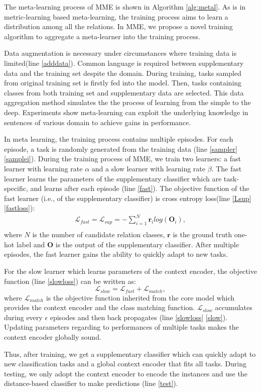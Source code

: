 The meta-learning process of MME is shown in Algorithm \ref{alg:metal}.
As is in metric-learning based meta-learning, the training process aims to learn a distribution among all the relations. In MME, we propose a novel training algorithm to aggregate a meta-learner into the training process.

Data augmentation is necessary under circumstances where training data is limited(line \ref{adddata}). Common language is required between supplementary data and the training set despite the domain. During training, tasks sampled from original training set is firstly fed into the model. Then, tasks containing classes from both training set and supplementary data are selected. This data aggregation method simulates the the process of learning from the simple to the deep. Experiments show meta-learning can exploit the underlying knowledge in sentences of various domain to achieve gains in performance.

In meta learning, the training process contains multiple episodes. For each episode, a task is randomly generated from the training data (line \ref{sampler} \ref{samplei}).
During the training process of MME, we train two learners: a fast learner with learning rate $\alpha$ and a slow learner with learning rate $\beta$.
The fast learner learns the parameters of the supplementary classifier which are task-specific, and learns after each episode (line \ref{fast}). The objective function of the fast learner (i.e., of the supplementary classifier) is cross entropy loss(line \ref{Lsup} \ref{fastloss}):
\begin{equation}
\begin{aligned}
    \mathcal{L}_{fast} = \mathcal{L}_{sup}= - \sum_{i=1}^{N} \mathbf{r}_i log(\mathbf{O}_i), \\
\end{aligned}
\end{equation}
where $N$ is the number of candidate relation classes, $\mathbf{r}$ is the ground truth one-hot label and $\mathbf{O}$ is the output of the supplementary classifier.
After multiple episodes, the fast learner gains the ability to quickly adapt to new tasks.


For the slow learner which learns parameters of the context encoder, the objective function (line \ref{slowloss}) can be written as:
\begin{equation}
\mathcal{L}_{slow} = \mathcal{L}_{fast} + \mathcal{L}_{match},
\end{equation}
where $\mathcal{L}_{match}$ is the objective function inherited from the core model which provides the context encoder and the class matching function. $\mathcal{L}_{slow}$ accumulates during every $\epsilon$ episodes and then back propagates (line \ref{slowloss} \ref{slow}). Updating parameters regarding to performances of multiple tasks makes the context encoder globally sound.

Thus, after training, we get a supplementary classifier which can quickly adapt to new classification tasks and a global context encoder that fits all tasks. During testing, we only adopt the context encoder to encode the instances and use the distance-based classifier to make predictions (line \ref{test}).
